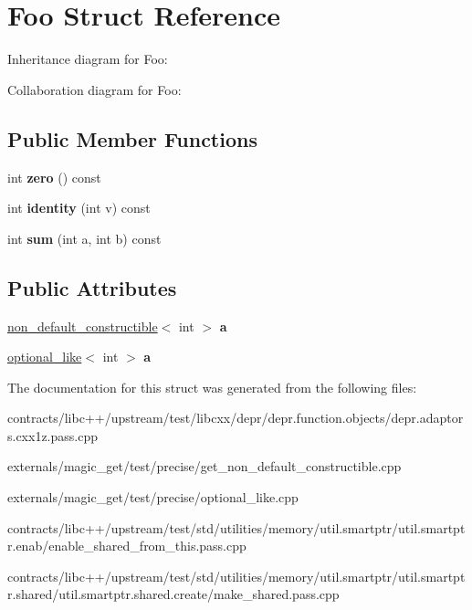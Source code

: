 \hypertarget{struct_foo}{}\section{Foo Struct Reference}
\label{struct_foo}


Inheritance diagram for Foo\+:


Collaboration diagram for Foo\+:
\subsection*{Public Member Functions}
\begin{DoxyCompactItemize}
\item 
\mbox{\label{struct_foo_a83966ed6fd08687b54f86583a1f78fb0}} 
int {\bfseries zero} () const
\item 
\mbox{\label{struct_foo_ac43e2abb3cdad64c094e7c807caa14c8}} 
int {\bfseries identity} (int v) const
\item 
\mbox{\label{struct_foo_af3e2d32ac0b498c5065609f500ff5084}} 
int {\bfseries sum} (int a, int b) const
\end{DoxyCompactItemize}
\subsection*{Public Attributes}
\begin{DoxyCompactItemize}
\item 
\mbox{\label{struct_foo_a02038be652d55c29cf44e27b12ac40ec}} 
\mbox{\hyperlink{structnon__default__constructible}{non\+\_\+default\+\_\+constructible}}$<$ int $>$ {\bfseries a}
\item 
\mbox{\label{struct_foo_a6ab66271ea3c52de1f6e46f99fcb36e5}} 
\mbox{\hyperlink{structoptional__like}{optional\+\_\+like}}$<$ int $>$ {\bfseries a}
\end{DoxyCompactItemize}


The documentation for this struct was generated from the following files\+:\begin{DoxyCompactItemize}
\item 
contracts/libc++/upstream/test/libcxx/depr/depr.\+function.\+objects/depr.\+adaptors.\+cxx1z.\+pass.\+cpp\item 
externals/magic\+\_\+get/test/precise/get\+\_\+non\+\_\+default\+\_\+constructible.\+cpp\item 
externals/magic\+\_\+get/test/precise/optional\+\_\+like.\+cpp\item 
contracts/libc++/upstream/test/std/utilities/memory/util.\+smartptr/util.\+smartptr.\+enab/enable\+\_\+shared\+\_\+from\+\_\+this.\+pass.\+cpp\item 
contracts/libc++/upstream/test/std/utilities/memory/util.\+smartptr/util.\+smartptr.\+shared/util.\+smartptr.\+shared.\+create/make\+\_\+shared.\+pass.\+cpp\end{DoxyCompactItemize}
